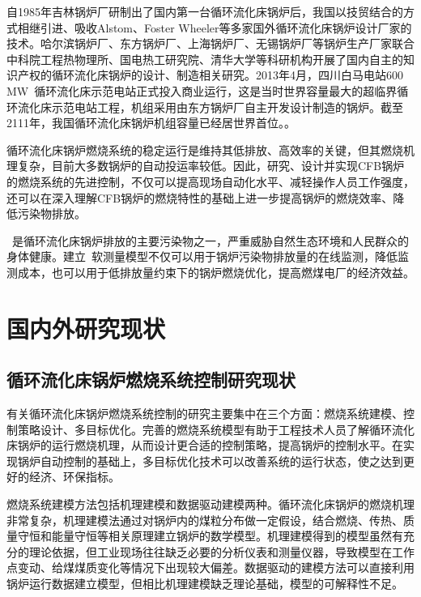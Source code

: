 自1985年吉林锅炉厂研制出了国内第一台循环流化床锅炉后，我国以技贸结合的方式相继引进、吸收Alstom、Foster Wheeler等多家国外循环流化床锅炉设计厂家的技术\cite{周一工2009}。哈尔滨锅炉厂、东方锅炉厂、上海锅炉厂、无锡锅炉厂等锅炉生产厂家联合中科院工程热物理所、国电热工研究院、清华大学等科研机构开展了国内自主的知识产权的循环流化床锅炉的设计、制造相关研究。2013年4月，四川白马电站600$\,$\si{\mega\watt}~循环流化床示范电站正式投入商业运行，这是当时世界容量最大的超临界循环流化床示范电站工程，机组采用由东方锅炉厂自主开发设计制造的锅炉。截至2111年，我国循环流化床锅炉机组容量已经居世界首位。\cite{岳光溪2016}。

循环流化床锅炉燃烧系统的稳定运行是维持其低排放、高效率的关键，但其燃烧机理复杂，目前大多数锅炉的自动投运率较低。因此，研究、设计并实现CFB锅炉的燃烧系统的先进控制，不仅可以提高现场自动化水平、减轻操作人员工作强度，还可以在深入理解CFB锅炉的燃烧特性的基础上进一步提高锅炉的燃烧效率、降低污染物排放。

~是循环流化床锅炉排放的主要污染物之一，严重威胁自然生态环境和人民群众的身体健康。建立~软测量模型不仅可以用于锅炉污染物排放量的在线监测，降低监测成本，也可以用于低排放量约束下的锅炉燃烧优化，提高燃煤电厂的经济效益。


\section{国内外研究现状}

\subsection{循环流化床锅炉燃烧系统控制研究现状}

有关循环流化床锅炉燃烧系统控制的研究主要集中在三个方面：燃烧系统建模、控制策略设计、多目标优化。完善的燃烧系统模型有助于工程技术人员了解循环流化床锅炉的运行燃烧机理，从而设计更合适的控制策略，提高锅炉的控制水平。在实现锅炉自动控制的基础上，多目标优化技术可以改善系统的运行状态，使之达到更好的经济、环保指标。

燃烧系统建模方法包括机理建模和数据驱动建模两种。循环流化床锅炉的燃烧机理非常复杂，机理建模法通过对锅炉内的煤粒分布做一定假设，结合燃烧、传热、质量守恒和能量守恒等相关原理建立锅炉的数学模型。机理建模得到的模型虽然有充分的理论依据，但工业现场往往缺乏必要的分析仪表和测量仪器，导致模型在工作点变动、给煤煤质变化等情况下出现较大偏差。数据驱动的建模方法可以直接利用锅炉运行数据建立模型，但相比机理建模缺乏理论基础，模型的可解释性不足。


